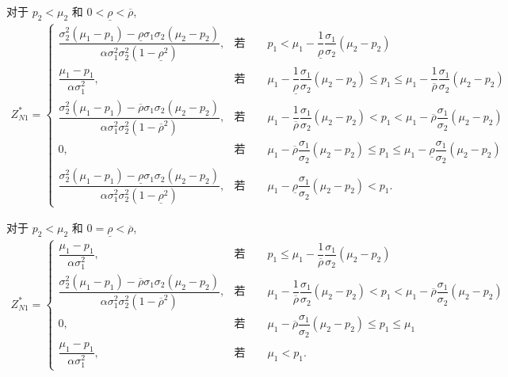 \documentclass[10.0pt]{article}
\begin{document}
对于 $ p_2 < \mu_2 $ 和 $ 0 < \underline{\rho} < \overline{\rho} $,
{\footnotesize \begin{eqnarray}
Z_{N 1}^* = \left\{ \begin{matrix}
\dfrac{\sigma_2^2 (\mu_1 - p_1) - \underline{\rho} \sigma_1 \sigma_2 (\mu_2 - p_2)}{\alpha \sigma_1^2 \sigma_2^2 (1 - \underline{\rho}^2)}, & \text{若} \qquad p_1 < \mu_1 - \dfrac1{\underline{\rho}} \dfrac{\sigma_1}{\sigma_2} (\mu_2 - p_2) \\
\dfrac{\mu_1 - p_1}{\alpha \sigma_1^2}, & \text{若} \qquad \mu_1 - \dfrac1{\underline{\rho}} \dfrac{\sigma_1}{\sigma_2} (\mu_2 - p_2) \leqslant p_1 \leqslant \mu_1 - \dfrac1{\overline{\rho}} \dfrac{\sigma_1}{\sigma_2} (\mu_2 - p_2) \\
\dfrac{\sigma_2^2 (\mu_1 - p_1) - \overline{\rho} \sigma_1 \sigma_2 (\mu_2 - p_2)}{\alpha \sigma_1^2 \sigma_2^2 (1 - \overline{\rho}^2)}, & \text{若} \qquad \mu_1 - \dfrac1{\overline{\rho}} \dfrac{\sigma_1}{\sigma_2} (\mu_2 - p_2) < p_1 < \mu_1 - \overline{\rho} \dfrac{\sigma_1}{\sigma_2} (\mu_2 - p_2) \\
0, & \text{若} \qquad \mu_1 - \overline{\rho} \dfrac{\sigma_1}{\sigma_2} (\mu_2 - p_2) \leqslant p_1 \leqslant \mu_1 - \underline{\rho} \dfrac{\sigma_1}{\sigma_2} (\mu_2 - p_2) \\
\dfrac{\sigma_2^2 (\mu_1 - p_1) - \underline{\rho} \sigma_1 \sigma_2 (\mu_2 - p_2)}{\alpha \sigma_1^2 \sigma_2^2 (1 - \underline{\rho}^2)}, & \text{若} \qquad \mu_1 - \underline{\rho} \dfrac{\sigma_1}{\sigma_2} (\mu_2 - p_2) < p_1.
\end{matrix} \right.
\end{eqnarray}}

对于 $ p_2 < \mu_2 $ 和 $ 0 = \underline{\rho} < \overline{\rho} $,
{\footnotesize \begin{eqnarray}
Z_{N 1}^* = \left\{ \begin{matrix}
\dfrac{\mu_1 - p_1}{\alpha \sigma_1^2}, & \text{若} \qquad p_1 \leqslant \mu_1 - \dfrac1{\overline{\rho}} \dfrac{\sigma_1}{\sigma_2} (\mu_2 - p_2) \\
\dfrac{\sigma_2^2 (\mu_1 - p_1) - \overline{\rho} \sigma_1 \sigma_2 (\mu_2 - p_2)}{\alpha \sigma_1^2 \sigma_2^2 (1 - \overline{\rho}^2)}, & \text{若} \qquad \mu_1 - \dfrac1{\overline{\rho}} \dfrac{\sigma_1}{\sigma_2} (\mu_2 - p_2) < p_1 < \mu_1 - \overline{\rho} \dfrac{\sigma_1}{\sigma_2} (\mu_2 - p_2) \\
0, & \text{若} \qquad \mu_1 - \overline{\rho} \dfrac{\sigma_1}{\sigma_2} (\mu_2 - p_2) \leqslant p_1 \leqslant \mu_1 \\
\dfrac{\mu_1 - p_1}{\alpha \sigma_1^2}, & \text{若} \qquad \mu_1 < p_1.
\end{matrix} \right.
\end{eqnarray}}
\end{document}
